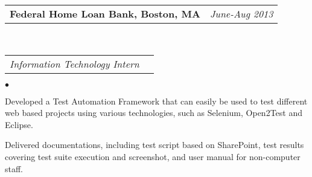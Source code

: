 \documentclass[11pt]{article}
\makeatletter
\newenvironment{achievements}{\begin{list}{$\bullet$}{\topsep 0pt \itemsep -2pt}}{\vspace*{4pt}\end{list}}
\newcommand{\headerrow}[2]
{\begin{tabular*}{\linewidth}{l@{\extracolsep{\fill}}r}
	\hspace*{-15pt}#1 & #2 \\
\end{tabular*}}
\newcommand{\headerrowww}[1]
{\begin{tabular*}{\linewidth}{l@{\extracolsep{\fill}}r}
	#1 &\\
\end{tabular*}}
\newcommand{\CPP}
 {C\nolinebreak[4]\hspace{-.05em}\raisebox{.22ex}{\footnotesize\bf ++}}
\makeatother
\begin{document}
\headerrow
{\textbf{Federal Home Loan Bank, Boston, MA}}
{\emph{June-Aug 2013}}
\\
\headerrowww
{\emph{Information Technology Intern}}
	\begin{achievements}
	\item Developed a Test Automation Framework that can easily be used to test different web based projects 
	using various technologies, such as Selenium, Open2Test and Eclipse.
	\item Delivered  documentations, including test script based on SharePoint, test results covering 
	test suite execution and screenshot, and user manual for non-computer staff.
	\end{achievements}
	
	




\end{document}
